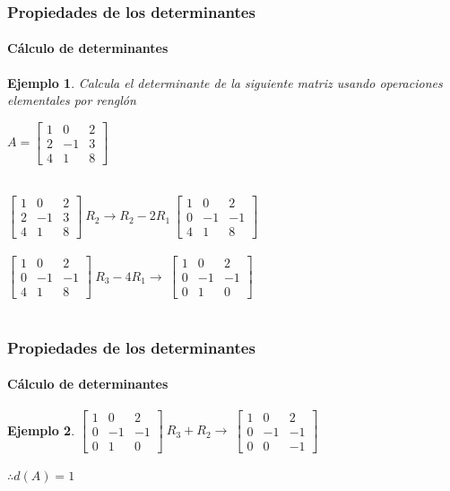 \documentclass[11pt]{beamer}
\newtheorem{ejem}{Ejemplo}
\begin{document}
\begin{frame}
\frametitle{Propiedades de los determinantes}
\framesubtitle{Cálculo de determinantes}
\begin{ejem}
Calcula el determinante de la siguiente matriz usando operaciones elementales por renglón
\begin{center}
${\displaystyle A = {\begin{bmatrix}1&0&2\\2&-1&3\\4&1&8\end{bmatrix}}}$\\ \hspace{0cm} \\
\end{center}
${\displaystyle {\begin{bmatrix}1&0&2\\2&-1&3\\4&1&8\end{bmatrix}}} 
~ R_2 \rightarrow R_2 -2R_1 ~ {\displaystyle {\begin{bmatrix}1&0&2\\0&-1&-1\\4&1&8\end{bmatrix}}}$\\ \hspace{0cm} \\

${\displaystyle {\begin{bmatrix}1&0&2\\0&-1&-1\\4&1&8\end{bmatrix}}} 
~ R_3 -4R_1 \rightarrow ~ {\displaystyle {\begin{bmatrix}1&0&2\\0&-1&-1\\0&1&0\end{bmatrix}}}$\\ \hspace{0cm} \\
\end{ejem}
\end{frame}

\begin{frame}
\frametitle{Propiedades de los determinantes}
\framesubtitle{Cálculo de determinantes}
\begin{ejem}
${\displaystyle {\begin{bmatrix}1&0&2\\0&-1&-1\\0&1&0\end{bmatrix}}} 
~ R_3 +R_2 \rightarrow ~ {\displaystyle {\begin{bmatrix}1&0&2\\0&-1&-1\\0&0&-1\end{bmatrix}}}$\\ \hspace{0cm} \\
$\therefore d(A) = 1$
\end{ejem}
\end{frame}
\end{document}
